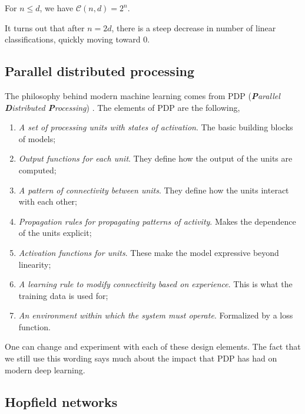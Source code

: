 \begin{corollary}
    For $n \leq d$, we have $\mathcal{C}(n, d) = 2^n$.
\end{corollary}

It turns out that after $n=2d$, there is a steep decrease in number of linear classifications,
quickly moving toward 0.

\subsection{Parallel distributed processing}

The philosophy behind modern machine learning comes from PDP (\textit{\textbf{P}arallel
    \textbf{D}istributed \textbf{P}rocessing}) \citep{rumelhart1986general,mcclelland1987parallel}. The
elements of PDP are the following,
\begin{enumerate}
    \item \textit{A set of processing units with states of activation}. The basic building blocks of models;
    \item \textit{Output functions for each unit}. They define how the output of the units are computed;
    \item \textit{A pattern of connectivity between units}. They define how the units interact with each other;
    \item \textit{Propagation rules for propagating patterns of activity}. Makes the dependence of the units
          explicit;
    \item \textit{Activation functions for units}. These make the model expressive beyond linearity;
    \item \textit{A learning rule to modify connectivity based on experience}. This is what the training data is used for;
    \item \textit{An environment within which the system must operate}. Formalized by a loss function.
\end{enumerate}
One can change and experiment with each of these design elements. The fact that we
still use this wording says much about the impact that PDP has had on modern deep learning.

\subsection{Hopfield networks}

